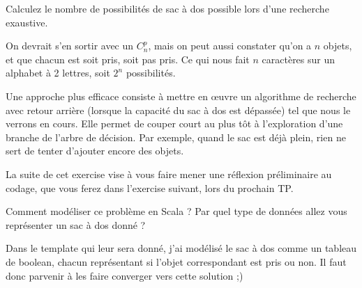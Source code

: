 \documentclass[10pt]{article}\usepackage[correction,nu]{esial}
\begin{document}
\Question Calculez le nombre de possibilités de sac à dos possible lors d'une
recherche exaustive.

\begin{Reponse}
  On devrait s'en sortir avec un $C_n^p$, mais on peut aussi constater qu'on a
  $n$ objets, et que chacun est soit pris, soit pas pris. Ce qui nous fait $n$
  caractères sur un alphabet à 2 lettres, soit $2^n$ possibilités.
\end{Reponse}

\medskip Une approche plus efficace consiste à mettre en œuvre un algorithme de
recherche avec retour arrière (lorsque la capacité du sac à dos est dépassée)
tel que nous le verrons en cours. Elle permet de couper court au plus tôt à
l'exploration d'une branche de l'arbre de décision. Par exemple, quand le sac
est déjà plein, rien ne sert de tenter d'ajouter encore des objets.

La suite de cet exercise vise à vous faire mener une réflexion préliminaire au
codage, que vous ferez dans l'exercise suivant, lors du prochain TP.

\Question Comment modéliser ce problème en Scala ? Par quel type de données allez
vous représenter un sac à dos donné ? 

\begin{Reponse}
  Dans le template qui leur sera donné, j'ai modélisé le sac à dos comme un
  tableau de boolean, chacun représentant si l'objet correspondant est pris ou
  non. Il faut donc parvenir à les faire converger vers cette solution ;) 
\end{Reponse}



\end{document}

